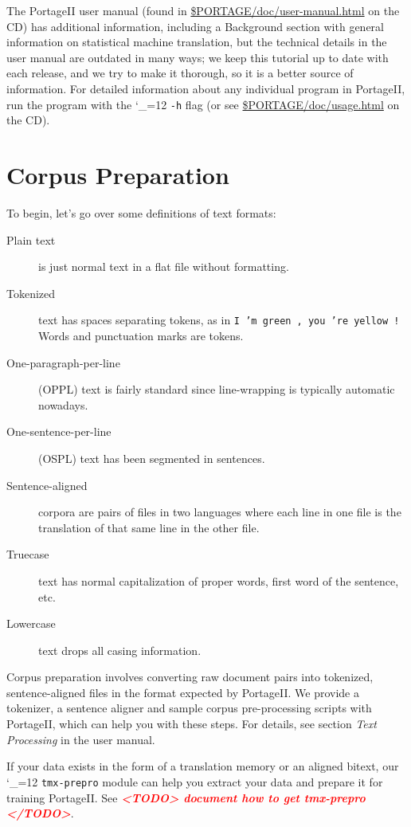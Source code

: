 \documentclass[11pt,letterpaper]{article}
\newcommand{\TODO}[1]{\emph{\textbf{\textcolor{red}{<TODO> #1 </TODO>}}}}
\newcommand{\PS}{PortageII\xspace}
\def\code{\begingroup\catcode`\_=12 \codex}
\newcommand{\codex}[1]{\texttt{#1}\endgroup}
\begin{document}
The \PS user manual (found in \url{$PORTAGE/doc/user-manual.html} on the CD)
has additional information, including a Background section with general
information on statistical machine translation, but the technical details in
the user manual are outdated in many ways; we keep this tutorial up to date
with each release, and we try to make it thorough, so it is a better source of
information.  For detailed information about any individual program in \PS, run
the program with the \code{-h} flag (or see \url{$PORTAGE/doc/usage.html} on
the CD).


\section{Corpus Preparation} \label{CorpusPreparation}

To begin, let's go over some definitions of text formats:
\begin{description}
  \item[Plain text] is just normal text in a flat file without formatting.
  \item[Tokenized] text has spaces separating tokens, as in \texttt{I 'm green
  , you 're yellow !} Words and punctuation marks are tokens.
  \item[One-paragraph-per-line] (OPPL) text is fairly standard since line-wrapping is
  typically automatic nowadays.
  \item[One-sentence-per-line] (OSPL) text has been segmented in sentences.
  \item[Sentence-aligned] corpora are pairs of files in two languages where
  each line in one file is the translation of that same line in the other file.
  \item[Truecase] text has normal capitalization of proper words, first word of
  the sentence, etc.
  \item[Lowercase] text drops all casing information.
\end{description}

Corpus preparation involves converting raw document pairs into tokenized,
sentence-aligned files in the format expected by \PS.  We provide a
tokenizer, a sentence aligner and sample corpus pre-processing scripts with
\PS, which can help you with these steps.  For details, see section \emph{Text
Processing} in the user manual.

If your data exists in the form of a translation memory or an aligned bitext,
our \code{tmx-prepro} module can help you extract your data and prepare it for
training \PS. See \TODO{document how to get tmx-prepro}.
\end{document}
